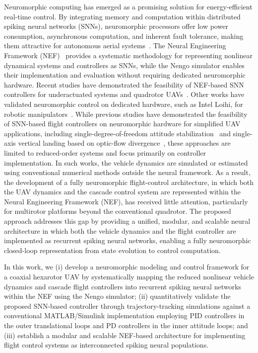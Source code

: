 \documentclass[conference]{IEEEtran}
\begin{document}
Neuromorphic computing has emerged as a promising solution for energy-efficient real-time control. By integrating memory and computation within distributed spiking neural networks (SNNs), neuromorphic processors offer low power consumption, asynchronous computation, and inherent fault tolerance, making them attractive for autonomous aerial systems~\cite{bouvier_spiking_2019}. The Neural Engineering Framework (NEF)~\cite{eliasmith_how_2013} provides a systematic methodology for representing nonlinear dynamical systems and controllers as SNNs, while the Nengo simulator enables their implementation and evaluation without requiring dedicated neuromorphic hardware.
Recent studies have demonstrated the feasibility of NEF-based SNN controllers for underactuated systems and quadrotor UAVs~\cite{OmarACC,Olivares2025,olivares_self-tuning_2026}. Other works have validated neuromorphic control on dedicated hardware, such as Intel Loihi, for robotic manipulators~\cite{dewolf_neuromorphic_2023}. While previous studies have demonstrated the feasibility of SNN-based flight controllers on neuromorphic hardware for simplified UAV applications, including single-degree-of-freedom attitude stabilization~\cite{Stagsted2020} and single-axis vertical landing based on optic-flow divergence~\cite{Dupeyroux2021}, these approaches are limited to reduced-order systems and focus primarily on controller implementation. In such works, the vehicle dynamics are simulated or estimated using conventional numerical methods outside the neural framework. As a result, the development of a fully neuromorphic flight-control architecture, in which both the UAV dynamics and the cascade control system are represented within the Neural Engineering Framework (NEF), has received little attention, particularly for multirotor platforms beyond the conventional quadrotor. The proposed approach addresses this gap by providing a unified, modular, and scalable neural architecture in which both the vehicle dynamics and the flight controller are implemented as recurrent spiking neural networks, enabling a fully neuromorphic closed-loop representation from state evolution to control computation.

In this work, we (i) develop a neuromorphic modeling and control framework for a coaxial hexarotor UAV by systematically mapping the reduced nonlinear vehicle dynamics and cascade flight controllers into recurrent spiking neural networks within the NEF using the Nengo simulator; (ii) quantitatively validate the proposed SNN-based controller through trajectory-tracking simulations against a conventional MATLAB/Simulink implementation employing PID controllers in the outer translational loops and PD controllers in the inner attitude loops; and (iii) establish a modular and scalable NEF-based architecture for implementing flight control systems as interconnected spiking neural populations.
\end{document}
